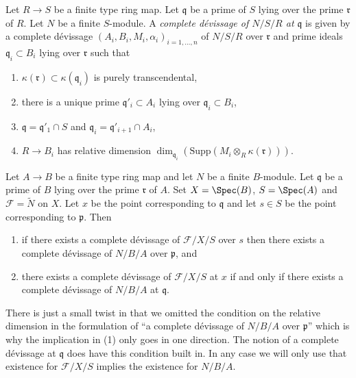 \begin{definition}
\label{definition-complete-devissage-at-x-algebra}
Let $R \to S$ be a finite type ring map.
Let $\mathfrak q$ be a prime of $S$ lying over the prime $\mathfrak r$ of $R$.
Let $N$ be a finite $S$-module.
A {\it complete d\'evissage of $N/S/R$ at $\mathfrak q$} is given by a
complete d\'evissage $(A_i, B_i, M_i, \alpha_i)_{i = 1, \ldots, n}$
of $N/S/R$ over $\mathfrak r$ and prime ideals $\mathfrak q_i \subset B_i$
lying over $\mathfrak r$ such that
\begin{enumerate}
\item $\kappa(\mathfrak r) \subset \kappa(\mathfrak q_i)$ is purely
transcendental,
\item there is a unique prime $\mathfrak q'_i \subset A_i$
lying over $\mathfrak q_i \subset B_i$,
\item $\mathfrak q = \mathfrak q'_1 \cap S$ and
$\mathfrak q_i = \mathfrak q'_{i + 1} \cap A_i$,
\item $R \to B_i$ has relative dimension
$\dim_{\mathfrak q_i}(\text{Supp}(M_i \otimes_R \kappa(\mathfrak r)))$.
\end{enumerate}
\end{definition}

\begin{remark}
\label{remark-same-notion}
Let $A \to B$ be a finite type ring map and let $N$ be a finite
$B$-module. Let $\mathfrak q$ be a prime of $B$ lying over the prime
$\mathfrak r$ of $A$. Set $X = \Spec(B)$, $S = \Spec(A)$ and
$\mathcal{F} = \widetilde{N}$ on $X$. Let $x$ be the point corresponding
to $\mathfrak q$ and let $s \in S$ be the point corresponding to
$\mathfrak p$. Then
\begin{enumerate}
\item if there exists a complete d\'evissage of $\mathcal{F}/X/S$
over $s$ then there exists a complete d\'evissage of
$N/B/A$ over $\mathfrak p$, and
\item there exists a complete d\'evissage of $\mathcal{F}/X/S$
at $x$ if and only if there exists a complete d\'evissage of
$N/B/A$ at $\mathfrak q$.
\end{enumerate}
There is just a small twist in that we omitted the condition on
the relative dimension in the formulation of ``a complete d\'evissage of
$N/B/A$ over $\mathfrak p$'' which is why the implication in (1)
only goes in one direction.
The notion of a complete d\'evissage at
$\mathfrak q$ does have this condition built in. In any case we will
only use that existence for $\mathcal{F}/X/S$
implies the existence for $N/B/A$.
\end{remark}

